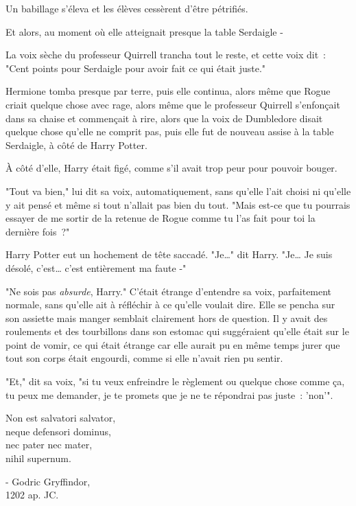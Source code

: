 Un babillage s'éleva et les élèves cessèrent d'être pétrifiés.

Et alors, au moment où elle atteignait presque la table Serdaigle -

La voix sèche du professeur Quirrell trancha tout le reste, et cette voix dit~: "Cent points pour Serdaigle pour avoir fait ce qui était juste."

Hermione tomba presque par terre, puis elle continua, alors même que Rogue criait quelque chose avec rage, alors même que le professeur Quirrell s'enfonçait dans sa chaise et commençait à rire, alors que la voix de Dumbledore disait quelque chose qu'elle ne comprit pas, puis elle fut de nouveau assise à la table Serdaigle, à côté de Harry Potter.

À côté d'elle, Harry était figé, comme s'il avait trop peur pour pouvoir bouger.

"Tout va bien," lui dit sa voix, automatiquement, sans qu'elle l'ait choisi ni qu'elle y ait pensé et même si tout n'allait pas bien du tout. "Mais est-ce que tu pourrais essayer de me sortir de la retenue de Rogue comme tu l'as fait pour toi la dernière fois~?"

Harry Potter eut un hochement de tête saccadé. "Je…" dit Harry. "Je… Je suis désolé, c'est… c'est entièrement ma faute -"

"Ne sois pas \emph{absurde}, Harry." C'était étrange d'entendre sa voix, parfaitement normale, sans qu'elle ait à réfléchir à ce qu'elle voulait dire. Elle se pencha sur son assiette mais manger semblait clairement hors de question. Il y avait des roulements et des tourbillons dans son estomac qui suggéraient qu'elle était sur le point de vomir, ce qui était étrange car elle aurait pu en même temps jurer que tout son corps était engourdi, comme si elle n'avait rien pu sentir.

"Et," dit sa voix, "si tu veux enfreindre le règlement ou quelque chose comme ça, tu peux me demander, je te promets que je ne te répondrai pas juste~: 'non'".
\later

\begin{center}
Non est salvatori salvator,\\
neque defensori dominus,\\
nec pater nec mater,\\
nihil supernum.

- Godric Gryffindor,\\
1202 ap. JC. 
\end{center}

